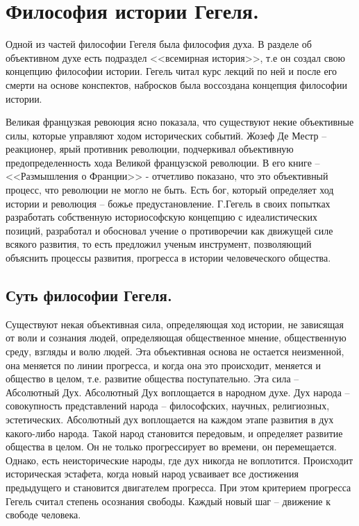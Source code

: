 
\section{Философия истории Гегеля.}

Одной из частей философии Гегеля была философия духа. В разделе об объективном духе есть подраздел <<всемирная история>>, т.е он создал свою концепцию философии истории. Гегель читал курс лекций по ней и после его смерти на основе конспектов, набросков была воссоздана концепция философии истории.

Великая французкая ревоюция ясно показала, что существуют некие объективные силы, которые управляют ходом исторических событий. Жозеф Де Местр – реакционер, ярый противник революции, подчеркивал объективную предопределенность хода Великой французской революции. В его книге – <<Размышления о Франции>> - отчетливо показано, что это объективный процесс, что революции не могло не быть. Есть бог, который определяет ход истории и революция – божье предустановление. Г.Гегель в своих попытках разработать собственную историософскую концепцию с идеалистических позиций, разработал и обосновал учение о противоречии как движущей силе всякого развития, то есть предложил ученым инструмент, позволяющий объяснить процессы развития, прогресса в истории человеческого общества.
\subsection{Суть философии Гегеля.}

Существуют некая объективная сила, определяющая ход истории, не зависящая от воли и сознания людей, определяющая общественное мнение, общественную среду, взгляды и волю людей. Эта объективная основа не остается неизменной, она меняется по линии прогресса, и когда она это происходит, меняется и общество в целом, т.е. развитие общества поступательно. Эта сила – Абсолютный Дух. Абсолютный Дух воплощается в народном духе. Дух народа – совокупность представлений народа – философских, научных, религиозных, эстетических. Абсолютный дух воплощается на каждом этапе развития в дух какого-либо народа. Такой народ становится передовым, и определяет развитие общества в целом. Он не только прогрессирует во времени, он перемещается. Однако, есть неисторические народы, где дух никогда не воплотится. Происходит историческая эстафета, когда новый народ усваивает все достижения предыдущего и становится двигателем прогресса. При этом критерием прогресса Гегель считал степень осознания свободы. Каждый новый шаг – движение к свободе человека.
